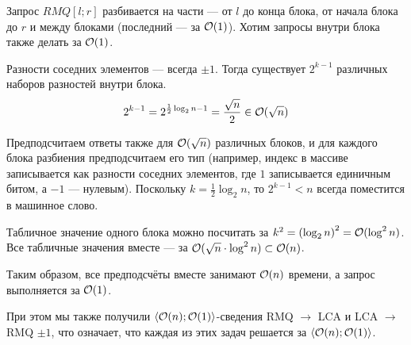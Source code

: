 Запрос $RMQ[l; r]$ разбивается на части
--- от $l$ до конца блока, от начала блока до $r$
и между блоками (последний --- за $\mathcal{O}(1)$).
Хотим запросы внутри блока также делать за $\mathcal{O}(1)$.

Разности соседних элементов --- всегда $\pm 1$.
Тогда существует $2^{k - 1}$ различных наборов разностей
внутри блока.
\[ 2^{k - 1} = 2^{\frac{1}{2} \log_2 n - 1} = \frac{\sqrt{n}}{2} \in \mathcal{O}(\sqrt{n}) \]

Предподсчитаем ответы также для $\mathcal{O}(\sqrt{n})$
различных блоков, и для каждого блока разбиения предподсчитаем
его тип (например, индекс в массиве записывается
как разности соседних элементов, где $1$ записывается
единичным битом, а $-1$ --- нулевым).
Поскольку $k = \frac{1}{2} \log_2 n$,
то $2^{k - 1} < n$ всегда поместится в машинное слово.

Табличное значение одного блока можно посчитать
за $k^2 = \left( \log_2 n \right)^2 = \mathcal{O}(\log^2 n)$.
Все табличные значения вместе
--- за $\mathcal{O}(\sqrt{n} \cdot \log^2 n) \subset \mathcal{O}(n)$.

Таким образом, все предподсчёты вместе занимают $\mathcal{O}(n)$
времени, а запрос выполняется за $\mathcal{O}(1)$.

При этом мы также получили
$\langle \mathcal{O}(n); \mathcal{O}(1) \rangle$-сведения
RMQ $\to$ LCA и LCA $\to$ RMQ $\pm 1$,
что означает, что каждая из этих задач решается за
$\langle \mathcal{O}(n); \mathcal{O}(1) \rangle$.
